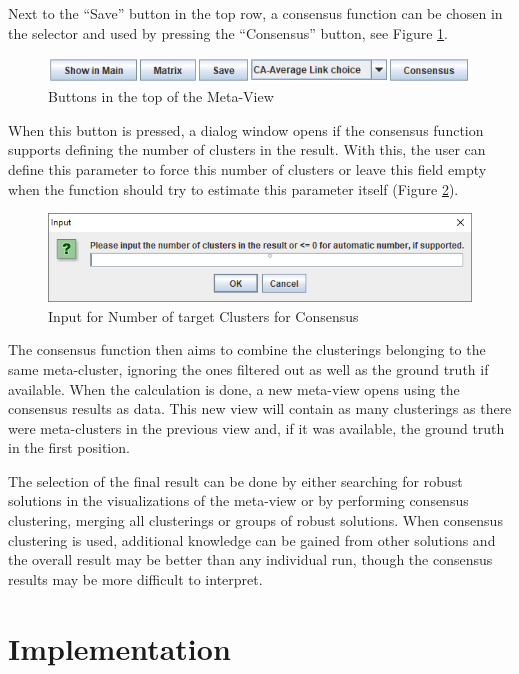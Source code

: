 \documentclass[
	a4paper,
	english,
	twoside,
	openright,               
	11pt                            
	]{report}
\begin{document}
Next to the ``Save'' button in the top row, a consensus function can be chosen in the selector and used by pressing the ``Consensus'' button, see Figure \ref{fig:cons_button}. 

\begin{figure}[h]
	\centering
	\includegraphics[scale=.75]{cons_button}
	\caption{Buttons in the top of the Meta-View}
	\label{fig:cons_button}
\end{figure}

When this button is pressed, a dialog window opens if the consensus function supports defining the number of clusters in the result. With this, the user can define this parameter to force this number of clusters or leave this field empty when the function should try to estimate this parameter itself (Figure \ref{fig:choosek_window}).

\begin{figure}[h]
	\centering
	\includegraphics[scale=.6]{choosek_window}
	\caption{Input for Number of target Clusters for Consensus}
	\label{fig:choosek_window}
\end{figure}

The consensus function then aims to combine the clusterings belonging to the same meta-cluster, ignoring the ones filtered out as well as the ground truth if available. When the calculation is done, a new meta-view opens using the consensus results as data. This new view will contain as many clusterings as there were meta-clusters in the previous view and, if it was available, the ground truth in the first position.

The selection of the final result can be done by either searching for robust solutions in the visualizations of the meta-view or by performing consensus clustering, merging all clusterings or groups of robust solutions. When consensus clustering is used, additional knowledge can be gained from other solutions and the overall result may be better than any individual run, though the consensus results may be more difficult to interpret.

\chapter{Implementation}\label{cha:impl}
\end{document}
